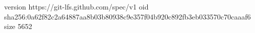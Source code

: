 version https://git-lfs.github.com/spec/v1
oid sha256:0a62f82c2a64887aa8b03b80938c9e357f04b920c892fb3eb033570c70caaaf6
size 5652
